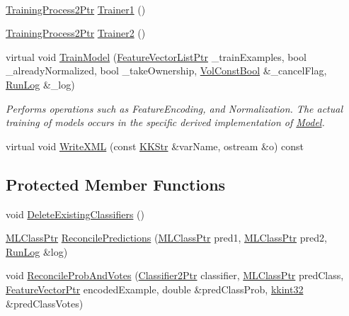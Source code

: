\begin{DoxyCompactItemize}
$$\item 
\hyperlink{namespace_k_k_m_l_l_a1fd087a9fde5db46fe14f6e98f994a71}{Training\+Process2\+Ptr} \hyperlink{class_k_k_m_l_l_1_1_model_dual_a92f8afb9349901a394984e7938602cc8}{Trainer1} ()
\item 
\hyperlink{namespace_k_k_m_l_l_a1fd087a9fde5db46fe14f6e98f994a71}{Training\+Process2\+Ptr} \hyperlink{class_k_k_m_l_l_1_1_model_dual_a0b6277b4d283ca73541c54348ac7539e}{Trainer2} ()
\item 
virtual void \hyperlink{class_k_k_m_l_l_1_1_model_dual_a9265e828fc1f34ad3fb955201007a1cc}{Train\+Model} (\hyperlink{namespace_k_k_m_l_l_acf2ba92a3cf03e2b19674b24ff488ef6}{Feature\+Vector\+List\+Ptr} \+\_\+train\+Examples, bool \+\_\+already\+Normalized, bool \+\_\+take\+Ownership, \hyperlink{namespace_k_k_b_a7d390f568e2831fb76b86b56c87bf92f}{Vol\+Const\+Bool} \&\+\_\+cancel\+Flag, \hyperlink{class_k_k_b_1_1_run_log}{Run\+Log} \&\+\_\+log)
\begin{DoxyCompactList}\small\item\em Performs operations such as Feature\+Encoding, and Normalization. The actual training of models occurs in the specific derived implementation of \textquotesingle{}\hyperlink{class_k_k_m_l_l_1_1_model}{Model}\textquotesingle{}. \end{DoxyCompactList}\item 
virtual void \hyperlink{class_k_k_m_l_l_1_1_model_dual_aaadcdb22013414b77214de27f13cb1b4}{Write\+X\+ML} (const \hyperlink{class_k_k_b_1_1_k_k_str}{K\+K\+Str} \&var\+Name, ostream \&o) const 
\end{DoxyCompactItemize}
\subsection*{Protected Member Functions}
\begin{DoxyCompactItemize}
\item 
void \hyperlink{class_k_k_m_l_l_1_1_model_dual_a7e03a851b95d005ab5d24150cd324976}{Delete\+Existing\+Classifiers} ()
\item 
\hyperlink{namespace_k_k_m_l_l_ac272393853d59e72e8456f14cd6d8c23}{M\+L\+Class\+Ptr} \hyperlink{class_k_k_m_l_l_1_1_model_dual_a3c48848a74244130f9757e0e411d5f4b}{Reconcile\+Predictions} (\hyperlink{namespace_k_k_m_l_l_ac272393853d59e72e8456f14cd6d8c23}{M\+L\+Class\+Ptr} pred1, \hyperlink{namespace_k_k_m_l_l_ac272393853d59e72e8456f14cd6d8c23}{M\+L\+Class\+Ptr} pred2, \hyperlink{class_k_k_b_1_1_run_log}{Run\+Log} \&log)
\item 
void \hyperlink{class_k_k_m_l_l_1_1_model_dual_aca263119cde1cffcce22061d4c51016f}{Reconcile\+Prob\+And\+Votes} (\hyperlink{namespace_k_k_m_l_l_ae49327d641e08f01c40df84678fad11e}{Classifier2\+Ptr} classifier, \hyperlink{namespace_k_k_m_l_l_ac272393853d59e72e8456f14cd6d8c23}{M\+L\+Class\+Ptr} pred\+Class, \hyperlink{namespace_k_k_m_l_l_a0c5df3d48f45926fbc4fee04f5e3bc04}{Feature\+Vector\+Ptr} encoded\+Example, double \&pred\+Class\+Prob, \hyperlink{namespace_k_k_b_a8fa4952cc84fda1de4bec1fbdd8d5b1b}{kkint32} \&pred\+Class\+Votes)
\end{DoxyCompactItemize}
